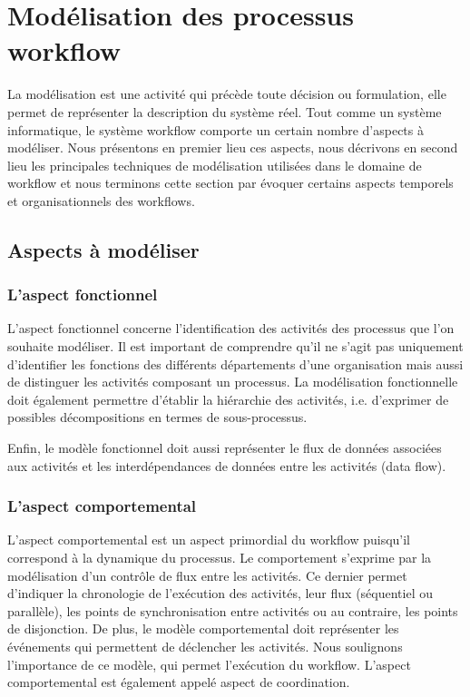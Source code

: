  
 \section{Modélisation des processus workflow
 }
 La modélisation est une activité qui précède toute décision ou formulation, elle permet de représenter la description du système réel. Tout comme un système informatique, le système workflow comporte un certain nombre d'aspects à modéliser. Nous présentons en premier lieu ces aspects, nous décrivons en second lieu les principales techniques de modélisation utilisées dans le domaine de workflow et nous terminons cette section par évoquer certains aspects temporels et organisationnels des workflows.
 
 \subsection{Aspects à modéliser}
 \subsubsection{L'aspect fonctionnel}
 L'aspect fonctionnel concerne l'identification des activités des processus que l'on souhaite modéliser. Il est important de comprendre qu'il ne s'agit pas uniquement d'identifier les fonctions des différents départements d'une organisation mais aussi de distinguer les activités composant un processus. La modélisation fonctionnelle doit également permettre d'établir la hiérarchie des activités, i.e. d'exprimer de possibles décompositions en termes de sous-processus. 
 
 Enfin, le modèle fonctionnel doit aussi représenter le flux de données associées aux activités et les interdépendances de données entre les activités (data flow). 
 \subsubsection{L'aspect comportemental}
 L'aspect comportemental est un aspect primordial du workflow puisqu'il correspond à la dynamique du processus. Le comportement s'exprime par la modélisation d'un contrôle de flux entre les activités. Ce dernier permet d'indiquer la chronologie de l'exécution des activités, leur flux (séquentiel ou parallèle), les points de synchronisation entre activités ou au contraire, les points de disjonction. De plus, le modèle comportemental doit représenter les événements qui permettent de déclencher les activités. Nous soulignons l'importance de ce modèle, qui permet l'exécution du workflow. L'aspect comportemental est également appelé aspect de coordination.
